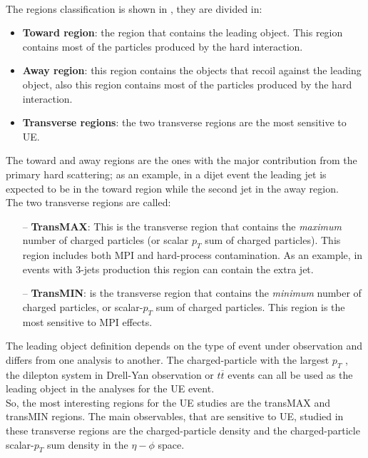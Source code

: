 %
\\
The regions classification is shown in , they are divided in:
\begin{itemize}
	\item \textbf{Toward region}: the region that contains the leading object. This region contains most of the particles produced by the hard interaction.
	\item \textbf{Away region}: this region contains the objects that recoil against the leading object, also this region contains most of the particles produced by the hard interaction.
	\item \textbf{Transverse regions}: the two transverse regions are the most sensitive to UE.
\end{itemize}
The toward and away regions are the ones with the major contribution from the primary hard scattering; as an example, in a dijet event the leading jet is expected to be in the toward region while the second  jet in the away region.  
\\
The two transverse regions are called:
\begin{itemize}
	\item[--] \textbf{TransMAX}: This is the transverse region that contains the \textit{maximum} number of charged particles (or scalar $p_T$ sum of charged particles). This region includes both MPI and hard-process contamination.
As an example, in events with 3-jets production this region can contain the extra jet.	
	\item[--] \textbf{TransMIN}: is the transverse region that contains the \textit{minimum} number of charged particles, or scalar-$p_T$ sum of charged particles. This region is the most  sensitive to MPI effects.
\end{itemize}

\noindent The leading object definition depends on the type of event under observation and differs from one analysis to another. 
The charged-particle with the largest $p_T$ \cite{CMS-PAS-FSQ-15-007}, the dilepton system in Drell-Yan observation \cite{CMS:2012oqb, CMS:2017ngy} or $t\overline{t}$ events \cite{CMS:2018mdd} can all be used as the leading object in the analyses for the UE event.
\\
So, the most interesting regions for the UE studies are the transMAX and transMIN regions. The main observables, that are sensitive to UE,  studied in these transverse regions are the charged-particle density and the charged-particle scalar-$p_T$ sum density in the $\eta-\phi$ space.



